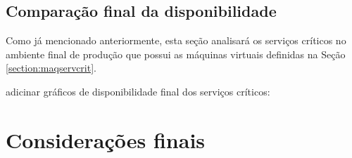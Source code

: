 \subsection{Comparação final da disponibilidade}
\label{section:comparacaofinal}

Como já mencionado anteriormente, esta seção analisará os serviços críticos no ambiente final de produção que possui as máquinas virtuais
definidas na Seção \ref{section:maqservcrit}. 

adicinar gráficos de disponibilidade final dos serviços críticos:



\section{Considerações finais}
